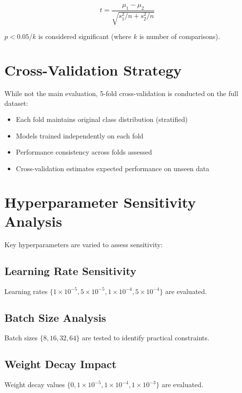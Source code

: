 \begin{equation}
t = \frac{\mu_1 - \mu_2}{\sqrt{s_1^2/n + s_2^2/n}}
\end{equation}

$p < 0.05/k$ is considered significant (where $k$ is number of comparisons).

\section{Cross-Validation Strategy}

While not the main evaluation, 5-fold cross-validation is conducted on the full dataset:

\begin{itemize}
    \item Each fold maintains original class distribution (stratified)
    \item Models trained independently on each fold
    \item Performance consistency across folds assessed
    \item Cross-validation estimates expected performance on unseen data
\end{itemize}

\section{Hyperparameter Sensitivity Analysis}

Key hyperparameters are varied to assess sensitivity:

\subsection{Learning Rate Sensitivity}

Learning rates $\{1 \times 10^{-5}, 5 \times 10^{-5}, 1 \times 10^{-4}, 5 \times 10^{-4}\}$ are evaluated.

\subsection{Batch Size Analysis}

Batch sizes $\{8, 16, 32, 64\}$ are tested to identify practical constraints.

\subsection{Weight Decay Impact}

Weight decay values $\{0, 1 \times 10^{-5}, 1 \times 10^{-4}, 1 \times 10^{-3}\}$ are evaluated.

